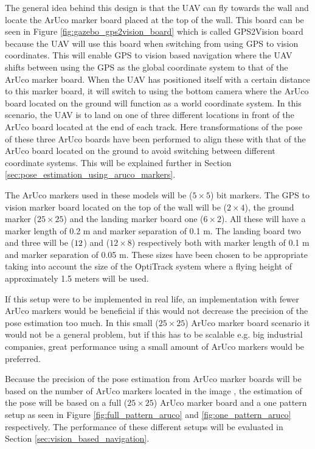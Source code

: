 \documentclass[../Head/report.tex]{subfiles}
\begin{document}
The general idea behind this design is that the UAV can fly towards the wall and locate the ArUco marker board placed at the top of the wall. This board can be seen in Figure \ref{fig:gazebo_gps2vision_board} which is called GPS2Vision board because the UAV will use this board when switching from using GPS to vision coordinates. This will enable GPS to vision based navigation where the UAV shifts between using the GPS as the global coordinate system to that of the ArUco marker board. When the UAV has positioned itself with a certain distance to this marker board, it will switch to using the bottom camera where the ArUco board located on the ground will function as a world coordinate system. In this scenario, the UAV is to land on one of three different locations in front of the ArUco board located at the end of each track. Here transformations of the pose of these three ArUco boards have been performed to align these with that of the ArUco board located on the ground to avoid switching between different coordinate systems. This will be explained further in Section \ref{sec:pose_estimation_using_aruco_markers}. 

The ArUco markers used in these models will be ($5 \times 5$) bit markers. The GPS to vision marker board located on the top of the wall will be ($2\times 4$), the ground marker ($25\times25$) and the landing marker board one ($6 \times2 $). All these will have a marker length of 0.2 m and marker separation of 0.1 m. The landing board two and three will be ($12 \time 4$) and ($12 \times8 $) respectively both with marker length of 0.1 m and marker separation of 0.05 m. These sizes have been chosen to be appropriate taking into account the size of the OptiTrack system where a flying height of approximately 1.5 meters will be used.

If this setup were to be implemented in real life, an implementation with fewer ArUco markers would be beneficial if this would not decrease the precision of the pose estimation too much. In this small ($25\times25$) ArUco marker board scenario it would not be a general problem, but if this has to be scalable e.g. big industrial companies, great performance using a small amount of ArUco markers would be preferred.

Because the precision of the pose estimation from ArUco marker boards will be based on the number of ArUco markers located in the image \cite{DetectionOfArUcoBoards}, the estimation of the pose will be based on a full ($25\times25$) ArUco marker board and a one pattern setup as seen in Figure \ref{fig:full_pattern_aruco} and \ref{fig:one_pattern_aruco} respectively. The performance of these different setups will be evaluated in Section \ref{sec:vision_based_navigation}.  
\end{document}
